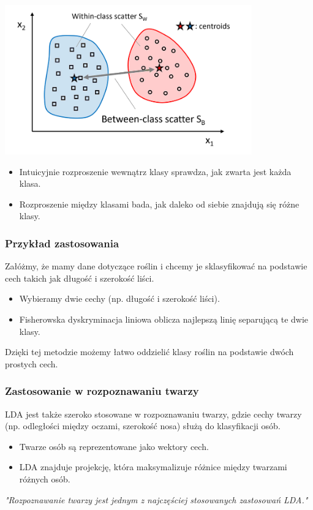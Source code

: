 \documentclass{beamer}
\begin{document}
\begin{frame}
    \includegraphics[width=0.8\textwidth]{rys.png}
    
    \bigskip
    \begin{itemize}
        \item Intuicyjnie rozproszenie wewnątrz klasy sprawdza, jak zwarta jest każda klasa.
        \item Rozproszenie między klasami bada, jak daleko od siebie znajdują się różne klasy.
    \end{itemize}
\end{frame}


\begin{frame}
    \frametitle{Przykład zastosowania}
    Załóżmy, że mamy dane dotyczące roślin i chcemy je sklasyfikować na podstawie cech takich jak długość i szerokość liści. 
    \begin{itemize}
        \item Wybieramy dwie cechy (np. długość i szerokość liści).
        \item Fisherowska dyskryminacja liniowa oblicza najlepszą linię separującą te dwie klasy.
    \end{itemize}
    
    Dzięki tej metodzie możemy łatwo oddzielić klasy roślin na podstawie dwóch prostych cech.
\end{frame}

\begin{frame}
    \frametitle{Zastosowanie w rozpoznawaniu twarzy}
    LDA jest także szeroko stosowane w rozpoznawaniu twarzy, gdzie cechy twarzy (np. odległości między oczami, szerokość nosa) służą do klasyfikacji osób.
    \begin{itemize}
        \item Twarze osób są reprezentowane jako wektory cech.
        \item LDA znajduje projekcję, która maksymalizuje różnice między twarzami różnych osób.
    \end{itemize}
    \textit{"Rozpoznawanie twarzy jest jednym z najczęściej stosowanych zastosowań LDA."}
\end{frame}
\end{document}
